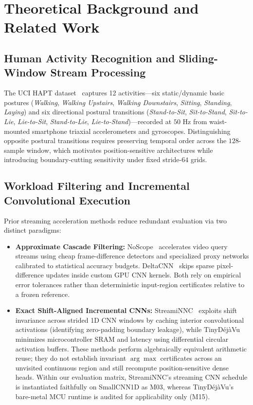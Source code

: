 \documentclass[11pt,oneside,a4paper]{report}
\newcommand{\code}[1]{{\small\upshape\ttfamily #1}}
\theoremstyle{remark}
\begin{document}
\chapter{Theoretical Background and Related Work}

\section{Human Activity Recognition and Sliding-Window Stream Processing}
The UCI HAPT dataset~\cite{reyesortiz2015hapt,reyes2016transition} captures 12 activities—six static/dynamic basic postures (\textit{Walking}, \textit{Walking Upstairs}, \textit{Walking Downstairs}, \textit{Sitting}, \textit{Standing}, \textit{Laying}) and six directional postural transitions (\textit{Stand-to-Sit}, \textit{Sit-to-Stand}, \textit{Sit-to-Lie}, \textit{Lie-to-Sit}, \textit{Stand-to-Lie}, \textit{Lie-to-Stand})—recorded at $50\text{ Hz}$ from waist-mounted smartphone triaxial accelerometers and gyroscopes. Distinguishing opposite postural transitions requires preserving temporal order across the $128$-sample window, which motivates position-sensitive architectures while introducing boundary-cutting sensitivity under fixed stride-$64$ grids.

\section{Workload Filtering and Incremental Convolutional Execution}
Prior streaming acceleration methods reduce redundant evaluation via two distinct paradigms:
\begin{itemize}[leftmargin=1.5em]
  \item \textbf{Approximate Cascade Filtering:} NoScope~\cite{kang2017noscope} accelerates video query streams using cheap frame-difference detectors and specialized proxy networks calibrated to statistical accuracy budgets. DeltaCNN~\cite{parger2022deltacnn} skips sparse pixel-difference updates inside custom GPU CNN kernels. Both rely on empirical error tolerances rather than deterministic input-region certificates relative to a frozen reference.
  \item \textbf{Exact Shift-Aligned Incremental CNNs:} StreamiNNC~\cite{streaminnc} exploits shift invariance across strided 1D CNN windows by caching interior convolutional activations (identifying zero-padding boundary leakage), while TinyD\'ej\`aVu~\cite{tinydejavu} minimizes microcontroller SRAM and latency using differential circular activation buffers. These methods perform algebraically equivalent arithmetic reuse; they do not establish invariant $\arg\max$ certificates across an unvisited continuous region and still recompute position-sensitive dense heads. Within our evaluation matrix, StreamiNNC's streaming CNN schedule is instantiated faithfully on \code{SmallCNN1D} as \code{M03}, whereas TinyD\'ej\`aVu's bare-metal MCU runtime is audited for applicability only (\code{M15}).
\end{itemize}
\end{document}
